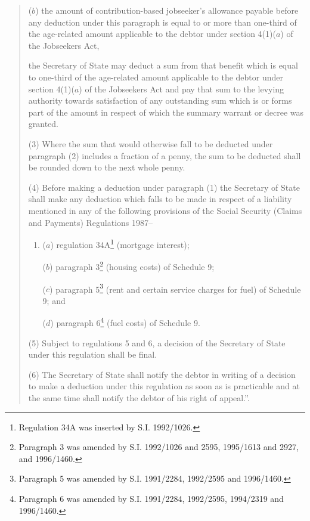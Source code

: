 \documentclass[12pt,a4paper]{article}
\begin{document}
\begin{quotation}
\begin{enumerate}
($b$) the amount of contribution-based jobseeker’s allowance payable before any deduction under this paragraph is equal to or more than one-third of the age-related amount applicable to the debtor under section 4(1)($a$)  of the Jobseekers Act,
\end{enumerate}
the Secretary of State may deduct a sum from that benefit which is equal to one-third of the age-related amount applicable to the debtor under section 4(1)($a$)  of the Jobseekers Act and pay that sum to the levying authority towards satisfaction of any outstanding sum which is or forms part of the amount in respect of which the summary warrant or decree was granted.

(3) Where the sum that would otherwise fall to be deducted under paragraph (2) includes a fraction of a penny, the sum to be deducted shall be rounded down to the next whole penny.

(4) Before making a deduction under paragraph (1) the Secretary of State shall make any deduction which falls to be made in respect of a liability mentioned in any of the following provisions of the Social Security (Claims and Payments) Regulations 1987–
\begin{enumerate}\item[]
($a$) regulation 34A\footnote{\frenchspacing Regulation 34A was inserted by S.I. 1992/1026.} (mortgage interest);

($b$) paragraph 3\footnote{\frenchspacing Paragraph 3 was amended by S.I. 1992/1026 and 2595, 1995/1613 and 2927, and 1996/1460.} (housing costs) of Schedule 9;

($c$) paragraph 5\footnote{\frenchspacing Paragraph 5 was amended by S.I. 1991/2284, 1992/2595 and 1996/1460.} (rent and certain service charges for fuel) of Schedule 9; and

($d$) paragraph 6\footnote{\frenchspacing Paragraph 6 was amended by S.I. 1991/2284, 1992/2595, 1994/2319 and 1996/1460.} (fuel costs) of Schedule 9.
\end{enumerate}

(5) Subject to regulations 5 and 6, a decision of the Secretary of State under this regulation shall be final.

(6) The Secretary of State shall notify the debtor in writing of a decision to make a deduction under this regulation as soon as is practicable and at the same time shall notify the debtor of his right of appeal.”.
\end{quotation}

\medskip
\end{document}
